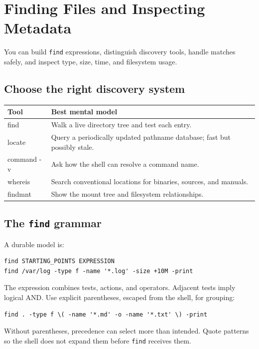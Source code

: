 \documentclass[11pt,oneside,openany]{book}
\newcommand{\chaptergoals}[1]{%
  \begin{tcolorbox}[colback=Paper,colframe=Blue,title={Learning outcomes},fonttitle=\bfseries]
  #1
  \end{tcolorbox}}
\begin{document}
\chapter{Finding Files and Inspecting Metadata}
\chaptergoals{You can build \texttt{find} expressions, distinguish discovery tools, handle matches safely, and inspect type, size, time, and filesystem usage.}

\section{Choose the right discovery system}
\begin{center}
\begin{tabularx}{0.95\textwidth}{>{\ttfamily}p{}X}
\toprule
Tool & Best mental model \\
\midrule
find & Walk a live directory tree and test each entry. \\
locate & Query a periodically updated pathname database; fast but possibly stale. \\
command -v & Ask how the shell can resolve a command name. \\
whereis & Search conventional locations for binaries, sources, and manuals. \\
findmnt & Show the mount tree and filesystem relationships. \\
\bottomrule
\end{tabularx}
\end{center}

\section{The \texttt{find} grammar}
A durable model is:
\begin{lstlisting}
find STARTING_POINTS EXPRESSION
find /var/log -type f -name '*.log' -size +10M -print
\end{lstlisting}
The expression combines tests, actions, and operators. Adjacent tests imply logical AND. Use explicit parentheses, escaped from the shell, for grouping:
\begin{lstlisting}
find . -type f \( -name '*.md' -o -name '*.txt' \) -print
\end{lstlisting}
Without parentheses, precedence can select more than intended. Quote patterns so the shell does not expand them before \texttt{find} receives them.
\end{document}
